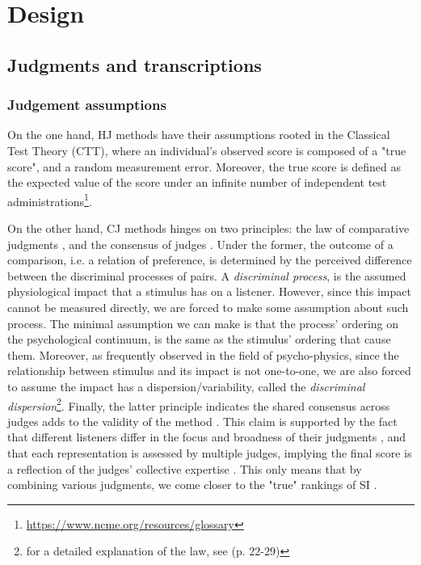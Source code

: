 \section{Design}
%
\subsection{Judgments and transcriptions}
%
\subsubsection{Judgement assumptions}
%
On the one hand, HJ methods have their assumptions rooted in the Classical Test Theory (CTT), where an individual's observed score is composed of a "true score", and a random measurement error. Moreover, the true score is defined as the expected value of the score under an infinite number of independent test administrations\footnote{\url{https://www.ncme.org/resources/glossary}}.

On the other hand, CJ methods hinges on two principles: the law of comparative judgments \citep{Thurstone_1927}, and the consensus of judges \citep{Lesterhuis_2018}. Under the former, the outcome of a comparison, i.e. a relation of preference, is determined by the perceived difference between the discriminal processes of pairs. A \textit{discriminal process}, is the assumed physiological impact that a stimulus has on a listener. However, since this impact cannot be measured directly, we are forced to make some assumption about such process. The minimal assumption we can make is that the process' ordering on the psychological continuum, is the same as the stimulus' ordering that cause them. Moreover, as frequently observed in the field of psycho-physics, since the relationship between stimulus and its impact is not one-to-one, we are also forced to assume the impact has a dispersion/variability, called the \textit{discriminal dispersion}\footnote{for a detailed explanation of the law, see \citet{Thurstone_1927, Verhavert_2018} (p. 22-29)}. Finally, the latter principle indicates the shared consensus across judges adds to the validity of the method \citep{Lesterhuis_2018}. This claim is supported by the fact that different listeners differ in the focus and broadness of their judgments \citep{Lesterhuis_2018}, and that each representation is assessed by multiple judges, implying the final score is a reflection of the judges’ collective expertise \citep{Pollitt_2012b}. This only means that by combining various judgments, we come closer to the "true" rankings of SI \citep{Lee_et_al_2014}.
%
%
